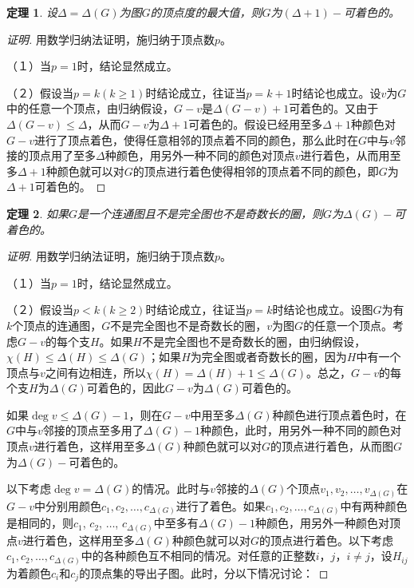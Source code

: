 \documentclass{book}[oneside]
\newtheorem{Thm}{定理}[chapter]
\begin{document}
\begin{CJK*}{UTF8}{gbsn}
  \begin{Thm}
    设$\Delta = \Delta (G)$为图$G$的顶点度的最大值，则$G$为$(\Delta+1)-$可着色的。
  \end{Thm}
  \begin{proof}[证明]用数学归纳法证明，施归纳于顶点数$p$。

    （１）当$p=1$时，结论显然成立。

    （２）假设当$p=k(k\geq 1)$时结论成立，往证当$p=k+1$时结论也成立。设$v$为$G$中的任意一个顶点，由归纳假设，$G-v$是$\Delta(G-v)+1$可着色的。又由于$\Delta(G-v) \leq \Delta$，从而$G-v$为$\Delta+1$可着色的。假设已经用至多$\Delta+1$种颜色对$G-v$进行了顶点着色，使得任意相邻的顶点着不同的颜色，那么此时在$G$中与$v$邻接的顶点用了至多$\Delta$种颜色，用另外一种不同的颜色对顶点$v$进行着色，从而用至多$\Delta+1$种颜色就可以对$G$的顶点进行着色使得相邻的顶点着不同的颜色，即$G$为$\Delta + 1$可着色的。
    
  \end{proof}
  \clearpage
  \begin{Thm}
    如果$G$是一个连通图且不是完全图也不是奇数长的圈，则$G$为$\Delta(G)-$可着色的。
  \end{Thm}

  \begin{proof}[证明]
    用数学归纳法证明，施归纳于顶点数$p$。

   （１）当$p=1$时，结论显然成立。

   （２）假设当$p<k(k\geq 2)$时结论成立，往证当$p=k$时结论也成立。设图$G$为有$k$个顶点的连通图，$G$不是完全图也不是奇数长的圈，$v$为图$G$的任意一个顶点。考虑$G-v$的每个支$H$。如果$H$不是完全图也不是奇数长的圈，由归纳假设，$\chi(H)\leq \Delta(H) \leq \Delta(G)$；如果$H$为完全图或者奇数长的圈，因为$H$中有一个顶点与$v$之间有边相连，所以$\chi(H) = \Delta(H) + 1 \leq \Delta(G)$。总之，$G-v$的每个支$H$为$\Delta(G)$可着色的，因此$G-v$为$\Delta(G)$可着色的。

   如果$\deg v \leq \Delta(G)-1$，则在$G-v$中用至多$\Delta(G)$种颜色进行顶点着色时，在$G$中与$v$邻接的顶点至多用了$\Delta(G)-1$种颜色，此时，用另外一种不同的颜色对顶点$v$进行着色，这样用至多$\Delta(G)$种颜色就可以对$G$的顶点进行着色，从而图$G$为$\Delta(G)-$可着色的。

   以下考虑$\deg v = \Delta(G)$的情况。此时与$v$邻接的$\Delta(G)$个顶点$v_1,v_2,\ldots,v_{\Delta(G)}$在$G-v$中分别用颜色$c_1,c_2,\ldots,c_{\Delta(G)}$进行了着色。如果$c_1,c_2,\ldots,c_{\Delta(G)}$中有两种颜色是相同的，则$c_1$, $c_2$, $\ldots$, $c_{\Delta(G)}$中至多有$\Delta(G)-1$种颜色，用另外一种颜色对顶点$v$进行着色，这样用至多$\Delta(G)$种颜色就可以对$G$的顶点进行着色。以下考虑$c_1,c_2,\ldots,c_{\Delta(G)}$中的各种颜色互不相同的情况。对任意的正整数$i$，$j$，$i\neq j$，设$H_{ij}$为着颜色$c_i$和$c_j$的顶点集的导出子图。此时，分以下情况讨论：


\end{proof}
\end{CJK*}
\end{document}
